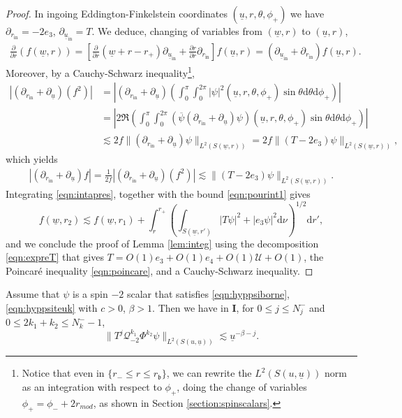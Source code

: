 \documentclass[reqno]{amsart}
\numberwithin{equation}{section}
\newcommand{\mcq}{\mathcal{Q}}
\newcommand{\mcu}{\mathcal{U}}
\newcommand{\wbar}{\underline{w}}
\newcommand{\ubar}{{\underline{u}}}
\newcommand{\carterm}{\mcq_{-2}}
\newcommand{\dee}{\mathrm{d}}
\newcommand{\rb}{r_\mathfrak{b}}
\theoremstyle{plain}
\theoremstyle{definition}
\theoremstyle{remark}
\numberwithin{equation}{section}
\begin{document}
\begin{proof}
    In ingoing Eddington-Finkelstein coordinates $(\ubar,r,\theta,\phi_+)$ we have $\partial_{r_\mathrm{in}}=-2e_3$, $\partial_{\ubar_{\mathrm{in}}}=T$. We deduce, changing of variables from $(\wbar,r)$ to $(\ubar,r)$,
    \begin{align}\label{eqn:intapres}
        \frac{\partial}{\partial r}(f(\wbar,r))=\left[\frac{\partial}{\partial r}(\wbar+r-r_+)\partial_{\ubar_\mathrm{in}}+\frac{\partial r}{\partial r}\partial_{r_\mathrm{in}}\right]f(\ubar,r)=(\partial_{\ubar_\mathrm{in}}+\partial_{r_\mathrm{in}})f(\ubar,r).
    \end{align}
    Moreover, by a Cauchy-Schwarz inequality\footnote{Notice that even in $\{r_-\leq r\leq \rb\}$, we can rewrite the $L^2(S(u,\ubar))$ norm as an integration with respect to $\phi_+$, doing the change of variables $\phi_+=\phi_-+2r_{mod}$, as shown in Section \ref{section:spinscalars}.},
    \begin{align*}
        |(\partial_{r_\mathrm{in}}+\partial_{\ubar})(f^2)|&=\left|(\partial_{r_\mathrm{in}}+\partial_{\ubar})\left(\int_0^\pi\int_0^{2\pi}|\psi|^2(\ubar,r,\theta,\phi_+)\sin\theta\dee\theta\dee\phi_+\right)\right|\\
        &=\left|2\mathfrak{R}\left(\int_0^\pi\int_0^{2\pi}(\overline{\psi} (\partial_{r_\mathrm{in}}+\partial_{\ubar})\psi)(\ubar,r,\theta,\phi_+)\sin\theta\dee\theta\dee\phi_+\right)\right|\\
        &\lesssim 2f\|(\partial_{r_\mathrm{in}}+\partial_{\ubar})\psi\|_{L^2(S(\wbar,r))}=2f\|(T-2e_3)\psi\|_{L^2(S(\wbar,r))},
    \end{align*}
    which yields
    \begin{align}\label{eqn:pourint1}
        |(\partial_{r_\mathrm{in}}+\partial_{\ubar})f|=\frac{1}{2f}|(\partial_{r_\mathrm{in}}+\partial_{\ubar})(f^2)|\lesssim\|(T-2e_3)\psi\|_{L^2(S(\wbar,r))}.
    \end{align}
    Integrating \eqref{eqn:intapres}, together with the bound \eqref{eqn:pourint1} gives
    $$f(\wbar,r_2)\lesssim f(\wbar,r_1)+\int_r^{r_+}\left(\int_{S(\wbar,r')}|T\psi|^2+|e_3\psi|^2\dee\nu\right)^{1/2}\dee r',$$
    and we conclude the proof of Lemma \ref{lem:integ} using the decomposition \eqref{eqn:expreT} that gives $T=O(1)e_3+O(1)e_4+O(1)\mcu+O(1)$, the Poincaré inequality \eqref{eqn:poincare}, and a Cauchy-Schwarz inequality.
\end{proof}
\begin{prop}\label{prop:decrT}
    Assume that $\psi$ is a spin $-2$ scalar that satisfies \eqref{eqn:hyppsiborne}, \eqref{eqn:hyppsiteuk} with $c>0$, $\beta>1$. Then we have in $\mathbf{I}$, for $0\leq j\leq N_j^-$ and $0\leq 2 k_1+k_2\leq N_k^--1$,
    $$\|T^j\carterm^{k_1}\Phi^{k_2}\psi\|_{L^2(S(u,\ubar))}\lesssim \ubar^{-\beta-j}.$$
\end{prop}
\end{document}
